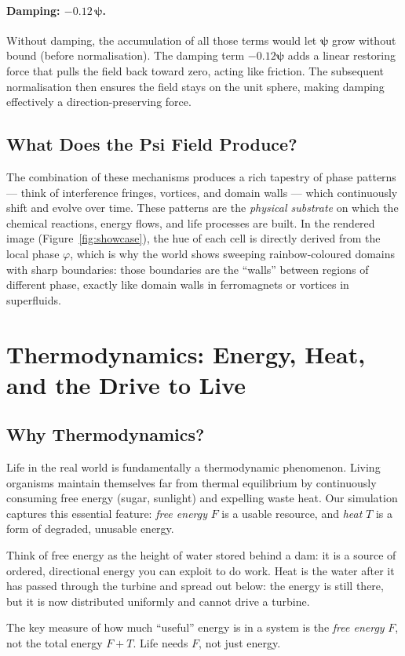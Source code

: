 \documentclass[12pt,a4paper]{article}
\newcommand{\bpsi}{\boldsymbol{\psi}}
\begin{document}
\paragraph{Damping: $-0.12\,\bpsi$.}
Without damping, the accumulation of all those terms would
let $\bpsi$ grow without bound (before normalisation).
The damping term $-0.12\bpsi$ adds a linear restoring
force that pulls the field back toward zero,
acting like friction.
The subsequent normalisation then ensures the field stays
on the unit sphere, making damping effectively a
direction-preserving force.

\subsection{What Does the Psi Field Produce?}

The combination of these mechanisms produces a rich tapestry of
phase patterns — think of interference fringes, vortices,
and domain walls — which continuously shift and evolve over time.
These patterns are the \emph{physical substrate} on which
the chemical reactions, energy flows, and life processes are built.
In the rendered image (Figure~\ref{fig:showcase}),
the hue of each cell is directly derived from the local phase $\varphi$,
which is why the world shows sweeping rainbow-coloured domains
with sharp boundaries: those boundaries are the ``walls'' between
regions of different phase, exactly like domain walls in
ferromagnets or vortices in superfluids.

\section{Thermodynamics: Energy, Heat, and the Drive to Live}

\subsection{Why Thermodynamics?}

Life in the real world is fundamentally a thermodynamic phenomenon.
Living organisms maintain themselves far from thermal equilibrium
by continuously consuming free energy (sugar, sunlight) and
expelling waste heat.
Our simulation captures this essential feature:
\emph{free energy} $F$ is a usable resource,
and \emph{heat} $T$ is a form of degraded, unusable energy.

\begin{tcolorbox}[intubox={Free energy vs heat}]
Think of free energy as the height of water stored behind a dam:
it is a source of ordered, directional energy you can exploit
to do work.
Heat is the water after it has passed through the turbine
and spread out below: the energy is still there,
but it is now distributed uniformly and cannot drive a turbine.

The key measure of how much ``useful'' energy is in a system
is the \emph{free energy} $F$, not the total energy $F + T$.
Life needs $F$, not just energy.
\end{tcolorbox}
\end{document}
